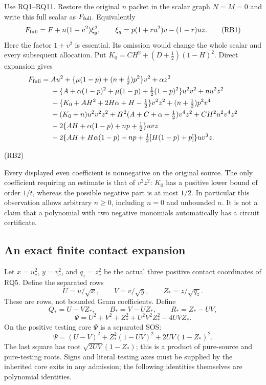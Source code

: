 Use RQ1--RQ11. Restore the original $n$ packet in the scalar graph
$N=M=0$ and write this full scalar as $F_{\rm full}$. Equivalently
\[
 F_{\rm full}=F+n(1+v^2)\xi_g^2,\qquad
 \xi_g=p(1+ru^2)v-(1-r)uz.
 \tag{RB1}
\]
Here the factor $1+v^2$ is essential. Its omission would change the
whole scalar and every subsequent allocation.
Put $K_0=CH^2+(D+\tfrac12)(1-H)^2$. Direct expansion gives
\begin{align*}
F_{\rm full}={}&
 Au^2+\{\mu(1-p)+(n+\tfrac12)p^2\}v^2+\alpha z^2\\
&+\{A+\alpha(1-p)^2+\mu(1-p)+\tfrac12(1-p)^2\}u^2v^2
 +nu^2z^2\\
&+\{K_0+AH^2+2H\alpha+H-\tfrac12\}v^2z^2
 +(n+\tfrac12)p^2v^4\\
&+(K_0+n)u^2v^2z^2
 +H^2(A+C+\alpha+\tfrac12)v^4z^2
 +CH^2u^2v^4z^2\\
&-2\{AH+\alpha(1-p)+np+\tfrac12\}uvz\\
&-2\{AH+H\alpha(1-p)+np+
                  \tfrac12[H(1-p)+p]\}uv^3z .
\end{align*}
\par\noindent\hfill\textup{(RB2)}\par
Every displayed even coefficient is nonnegative on the original
source. The only coefficient requiring an estimate is that of
$v^2z^2$: $K_0$ has a positive lower bound of order $1/t$, whereas
the possible negative part is at most $1/2$. In particular this
observation allows arbitrary $n\ge0$, including $n=0$ and unbounded
$n$. It is not a claim that a polynomial with two negative monomials
automatically has a circuit certificate.

\subsection{An exact finite contact expansion}

Let $x=u_c^2$, $y=v_c^2$, and $q_z=z_c^2$ be the actual three
positive contact coordinates of RQ5. Define the separated rows
\[
 U=u/\sqrt{x},\qquad V=v/\sqrt{y},\qquad Z_*=z/\sqrt{q_z}.
 \tag{RB3}
\]
These are rows, not bounded Gram coefficients. Define
\[
 Q_*=U-VZ_*,\qquad B_*=V-UZ_*,\qquad R_*=Z_*-UV,
\]
\[
 \Psi=U^2+V^2+Z_*^2+U^2V^2Z_*^2-4UVZ_* .
 \tag{RB4}
\]
On the positive testing core $\Psi$ is a separated SOS:
\[
 \Psi=(U-V)^2+Z_*^2(1-UV)^2
                     +2UV(1-Z_*)^2.
 \tag{RB5}
\]
The last square has root $\sqrt{2UV}(1-Z_*)$; this is a product
of pure-source and pure-testing roots. Signs and literal testing
axes must be supplied by the inherited core exits in any admission;
the following identities themselves are polynomial identities.

